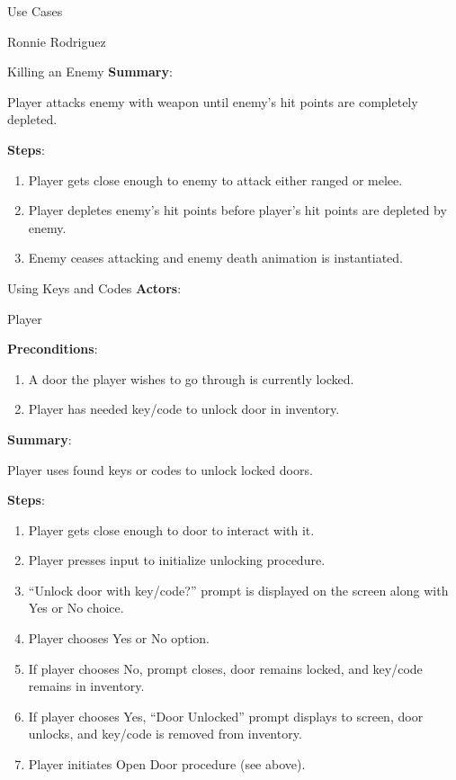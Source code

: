 \documentclass[12pt]{report}
\begin{document}
\begin{section}{Use Cases}
\begin{subsection}{Ronnie Rodriguez}
\begin{subsubsection}{Killing an Enemy}
\textbf{Summary}:

Player attacks enemy with weapon until enemy's hit points are
completely depleted.

\textbf{Steps}:

\begin{enumerate}
\item Player gets close enough to enemy to attack either ranged or melee.
\item Player depletes enemy's hit points before player's hit points are
depleted by enemy.
\item Enemy ceases attacking and enemy death animation is instantiated.
\end{enumerate}
\end{subsubsection}

\begin{subsubsection}{Using Keys and Codes}
\textbf{Actors}:

Player

\textbf{Preconditions}:

\begin{enumerate}
\item A door the player wishes to go through is currently locked.
\item Player has needed key/code to unlock door in inventory.
\end{enumerate}

\textbf{Summary}:

Player uses found keys or codes to unlock locked doors.

\textbf{Steps}:

\begin{enumerate}
\item Player gets close enough to door to interact with it.
\item Player presses input to initialize unlocking procedure.
\item ``Unlock door with key/code?'' prompt is displayed on the screen along
with Yes or No choice.
\item Player chooses Yes or No option.
\item If player chooses No, prompt closes, door remains locked, and key/code
remains in inventory.
\item If player chooses Yes, ``Door Unlocked'' prompt displays to screen,
door unlocks, and key/code is removed from inventory.
\item Player initiates Open Door procedure (see above).
\end{enumerate}
\end{subsubsection}


\end{subsection}
\end{section}
\end{document}
